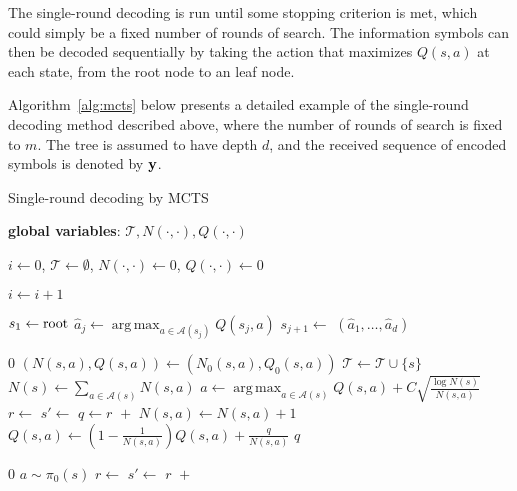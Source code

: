 \documentclass[conference,letterpaper]{IEEEtran}
\DeclareMathOperator*{\argmax}{arg\,max}
\begin{document}
The single-round decoding is run until some stopping criterion is met, which could simply be a fixed number of rounds of search. 
The information symbols can then be decoded sequentially by taking the action that maximizes $Q(s,a)$ at each state, from the root node to an leaf node.

Algorithm~\ref{alg:mcts} below presents a detailed example of the single-round decoding method described above, where the number of rounds of search is fixed to $m$. The tree is assumed to have depth $d$, and the received sequence of encoded symbols is denoted by $\bf y$.

\begin{algorithm}
	\caption{Single-round decoding by MCTS}\label{alg:mcts}
	\begin{algorithmic}[1]
		\State\textbf{global variables}: $\mathcal T, N(\cdot,\cdot), Q(\cdot,\cdot)$
		
		
		
		\State $i \gets 0$, $\mathcal T\gets \emptyset$, $N(\cdot,\cdot) \gets 0$,  $Q(\cdot,\cdot)\gets 0$
		
		
		\State {}
		\State $i \gets i+1$
		\EndWhile\label{mctswhile}
		
		
		\State $s_1 \gets {\rm root}$
		\State $\hat a_j \gets \argmax_{a\in\mathcal A(s_j)} Q(s_j,a)$ %
		\State $s_{j+1} \gets$ 
		\EndFor
		\State\Return $(\hat a_1, \ldots, \hat a_d)$
		\EndFunction
		
		\medskip
		
		\State \Return $0$
		\EndIf
		\State $(N(s,a), Q(s,a)) \gets (N_0(s,a), Q_0(s,a))$
		\EndFor
		\State $\mathcal T \gets \mathcal T \cup \{s\}$
		\State\Return {}
		\EndIf
		\State $N(s) \gets \sum_{a\in\mathcal A(s)} N(s,a)$
		\State $a \gets \argmax_{a\in\mathcal A(s)} Q(s,a) + C\sqrt{\frac{\log N(s)}{N(s,a)}}$ 
		\State $r \gets $ 
		\State $s' \gets $ 
		\State $q \gets r  \,\, + $ 
		\State $N(s,a) \gets N(s,a) + 1$
		\State $Q(s,a) \gets (1-\frac{1}{N(s,a)})Q(s,a) + \frac{q}{N(s,a)}$
		\State\Return $q$
		\EndFunction\label{fn:sim}
		
		\medskip
		
		\State\Return $0$
		\EndIf
		\State $a\sim \pi_0(s)$
		\State $r \gets $ 
		\State $s' \gets $ 
		\State\Return $r \,\, + $ 
		\EndFunction
		
	\end{algorithmic}
\end{algorithm}
\end{document}
